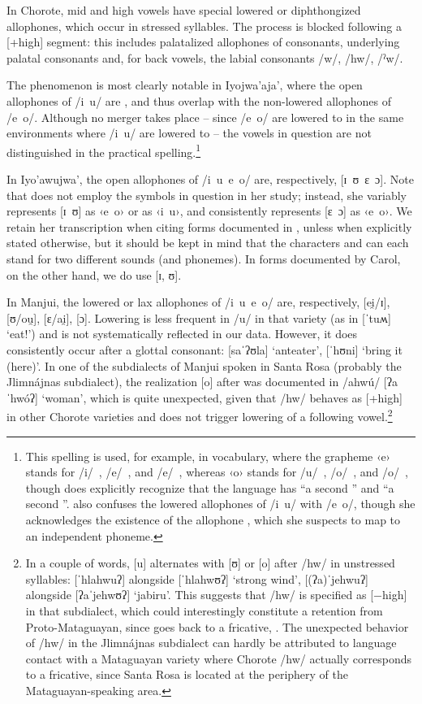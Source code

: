 In Chorote, mid and high vowels have special lowered or diphthongized allophones, which occur in stressed syllables. The process is blocked following a [+high] segment: this includes palatalized allophones of consonants, underlying palatal consonants and, for back vowels, the labial consonants /w/, /hw/, /ˀw/.

The phenomenon is most clearly notable in Iyojwa'aja', where the open allophones of /i~u/ are , and thus overlap with the non-lowered allophones of /e~o/. Although no merger takes place -- since /e~o/ are lowered to  in the same environments where /i~u/ are lowered to  -- the vowels in question are not distinguished in the practical spelling.\footnote{This spelling is used, for example, in  vocabulary, where the grapheme ‹e› stands for /i/~, /e/~, and /e/~, whereas ‹o› stands for /u/~, /o/~, and /o/~, though \citet[91]{ND09} does explicitly recognize that the language has ``a second '' and ``a second ''. \citet{AG78,AG79} also confuses the lowered allophones of /i~u/ with /e~o/, though she acknowledges the existence of the allophone , which she suspects to map to an independent phoneme.}

In Iyo’awujwa’, the open allophones of /i~u~e~o/ are, respectively, [ɪ~ʊ~ɛ~ɔ]. Note that \citet{AG83} does not employ the symbols in question in her study; instead, she variably represents [ɪ~ʊ] as ‹e~o› or as ‹i~u›, and consistently represents [ɛ~ɔ] as ‹e~o›. We retain her transcription when citing forms documented in \citet{AG83}, unless when explicitly stated otherwise, but it should be kept in mind that the characters  and  can each stand for two different sounds (and phonemes). In forms documented by Carol, on the other hand, we do use [ɪ, ʊ].

In Manjui, the lowered or lax allophones of /i~u~e~o/ are, respectively, [ei̯/ɪ], [ʊ/ou̯], [ɛ/ai̯], [ɔ]. Lowering is less frequent in /u/ in that variety (as in [ˈtuʍ] `eat!') and is not systematically reflected in our data. However, it does consistently occur after a glottal consonant: [saˈʔʊla] `anteater', [ˈhʊni] `bring it (here)'. In one of the subdialects of Manjui spoken in Santa Rosa (probably the Jlimnájnas subdialect), the realization [o] after  was documented in /ahwú/ [ʔaˈhwóʔ] ‘woman’, which is quite unexpected, given that /hw/ behaves as [+high] in other Chorote varieties and does not trigger lowering of a following vowel.\footnote{In a couple of words, [u] alternates with [ʊ] or [o] after /hw/ in unstressed syllables: [ˈhlahwuʔ] alongside [ˈhlahwʊʔ] ‘strong wind’, [(ʔa)ˈjehwuʔ] alongside [ʔaˈjehwʊʔ] ‘jabiru’. This suggests that /hw/ is specified as [−high] in that subdialect, which could interestingly constitute a retention from Proto-Mataguayan, since  goes back to a fricative, . The unexpected behavior of /hw/ in the Jlimnájnas subdialect can hardly be attributed to language contact with a Mataguayan variety where Chorote /hw/ actually corresponds to a fricative, since Santa Rosa is located at the periphery of the Mataguayan-speaking area.} 

